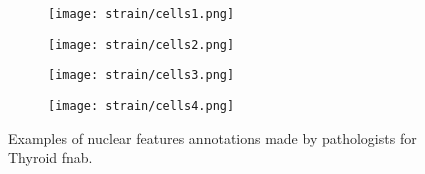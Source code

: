 \begin{figure}
    \centering
    \begin{subfigure}{.235\textwidth}
      \centering
      \texttt{[image: strain/cells1.png]}
      \caption{}
      \label{app:strain:sfig:cell1}
    \end{subfigure}
    \begin{subfigure}{.235\textwidth}
      \centering
      \texttt{[image: strain/cells2.png]}
      \caption{}
      \label{app:strain:sfig:cell2}
    \end{subfigure}
    \begin{subfigure}{.235\textwidth}
      \centering
      \texttt{[image: strain/cells3.png]}
      \caption{}
      \label{app:strain:sfig:cell3}
    \end{subfigure}
    \begin{subfigure}{.235\textwidth}
      \centering
      \texttt{[image: strain/cells4.png]}
      \caption{}
      \label{app:strain:sfig:cell4}
    \end{subfigure}
    \caption{Examples of nuclear features annotations made by pathologists for Thyroid \acrshort{fnab}.}
    \label{app:strain:fig:cells_examples}
\end{figure}

